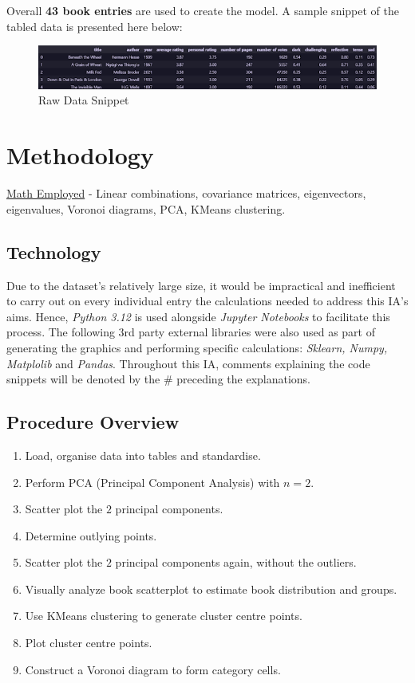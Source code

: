 \documentclass[12pt]{article}
\begin{document}
Overall \textbf{43 book entries} are used to create the model. A sample snippet of the tabled data is
presented here below:

\begin{figure}[H]
	\includegraphics[width=\textwidth]{1}
	\centering
	\caption{Raw Data Snippet}
\end{figure}

\section{Methodology}

\underline{Math Employed} - Linear combinations, covariance matrices, eigenvectors, eigenvalues, Voronoi diagrams, PCA, KMeans clustering.

\subsection{Technology}
Due to the dataset’s relatively large size, it would be impractical and inefficient to carry out on every
individual entry the calculations needed to address this IA’s aims. 
Hence, \textit{Python 3.12} is used alongside \textit{Jupyter Notebooks} to facilitate this process. 
The following 3rd party external libraries were also used as part of generating the 
graphics and performing specific calculations: \textit{Sklearn, Numpy, Matplolib} and \textit{Pandas}. 
Throughout this IA, comments explaining the code snippets will be denoted by the \# preceding the explanations.

\subsection{Procedure Overview}
\begin{question}
    \begin{enumerate}
    \itemsep -1em 
        \item Load, organise data into tables and standardise.
        \item Perform PCA (Principal Component Analysis) with $n = 2$.
        \item Scatter plot the $2$ principal components.
        \item Determine outlying points.
        \item Scatter plot the $2$ principal components again, without the outliers.
        \item Visually analyze book scatterplot to estimate book distribution and groups.
        \item Use KMeans clustering to generate cluster centre points.
        \item Plot cluster centre points.
        \item Construct a Voronoi diagram to form category cells.
    \end{enumerate}
\end{question}
\end{document}
